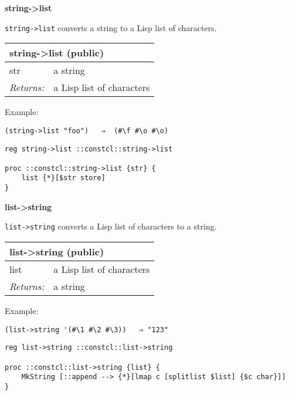 \documentclass{report}
\begin{document}
\textbf{string->list}


\texttt{string->list} converts a string to a Lisp list of characters.

\begin{tabular}{ |l l| }
\hline
\multicolumn{2}{|l|}{string->list (public)} \\
\hline
str & a string \\
\textit{Returns:} & a Lisp list of characters \\
\hline
\end{tabular}


Example:

\noindent\makebox[\linewidth]{\rule{\linewidth}{0.4pt}}
\begin{lstlisting}
(string->list "foo")   ⇒  (#\f #\o #\o)
\end{lstlisting}
\noindent\makebox[\linewidth]{\rule{\linewidth}{0.4pt}}
\noindent\makebox[\linewidth]{\rule{\linewidth}{0.4pt}}
\begin{lstlisting}
reg string->list ::constcl::string->list
 
proc ::constcl::string->list {str} {
    list {*}[$str store]
}
\end{lstlisting}
\noindent\makebox[\linewidth]{\rule{\linewidth}{0.4pt}}

\textbf{list->string}


\texttt{list->string} converts a Lisp list of characters to a string.

\begin{tabular}{ |l l| }
\hline
\multicolumn{2}{|l|}{list->string (public)} \\
\hline
list & a Lisp list of characters \\
\textit{Returns:} & a string \\
\hline
\end{tabular}


Example:

\noindent\makebox[\linewidth]{\rule{\linewidth}{0.4pt}}
\begin{lstlisting}
(list->string '(#\1 #\2 #\3))   ⇒ "123"
\end{lstlisting}
\noindent\makebox[\linewidth]{\rule{\linewidth}{0.4pt}}
\noindent\makebox[\linewidth]{\rule{\linewidth}{0.4pt}}
\begin{lstlisting}
reg list->string ::constcl::list->string
 
proc ::constcl::list->string {list} {
    MkString [::append --> {*}[lmap c [splitlist $list] {$c char}]]
}
\end{lstlisting}
\noindent\makebox[\linewidth]{\rule{\linewidth}{0.4pt}}
\end{document}
